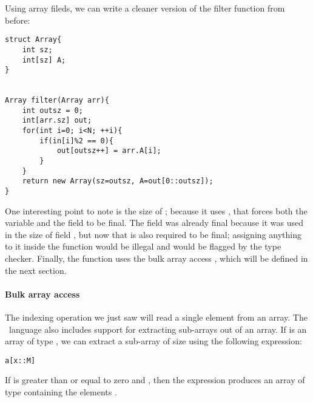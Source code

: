 \begin{Example}
Using array fileds, we can write a cleaner version of the filter function from before:
\begin{lstlisting}
struct Array{
	int sz;
	int[sz] A;
}


Array filter(Array arr){
	int outsz = 0;
	int[arr.sz] out;
	for(int i=0; i<N; ++i){
		if(in[i]%2 == 0){
			out[outsz++] = arr.A[i];
		}
	}
	return new Array(sz=outsz, A=out[0::outsz]);
}
\end{lstlisting}
One interesting point to note is the size of ; because it uses , that forces both the variable  and the field  to be final. The field  was already final because it was used in the size of field , but now that  is also required to be final; assigning anything to it inside the function would be illegal and would be flagged by the type checker. Finally, the function uses the bulk array access , which will be defined in the next section.
\end{Example}







\paragraph{Bulk array access}
The indexing operation we just saw will read a single element from an array. The \SK\ language also includes support for extracting sub-arrays out of an array. If  is an array of type , we can extract a sub-array of size  using the following expression: 
\begin{lstlisting}
a[x::M]
\end{lstlisting}

If  is greater than or equal to zero and , then the expression  produces an array of type  containing the elements . 

